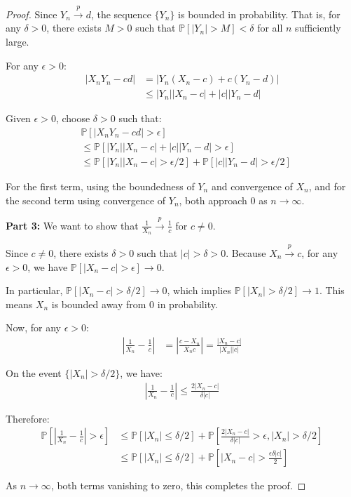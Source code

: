\begin{proof}
    Since $Y_n \xrightarrow{p} d$, the sequence $\{Y_n\}$ is bounded in probability. That is, for any $\delta > 0$, there exists $M > 0$ such that $\mathbb{P}[|Y_n| > M] < \delta$ for all $n$ sufficiently large.
    
    For any $\epsilon > 0$:
    \begin{align*}
        |X_n Y_n - cd| &= |Y_n(X_n - c) + c(Y_n - d)| \\
        &\leq |Y_n||X_n - c| + |c||Y_n - d|
    \end{align*}
    
    Given $\epsilon > 0$, choose $\delta > 0$ such that:
    \begin{align*}
        &\mathbb{P}[|X_n Y_n - cd| > \epsilon] \\
        &\leq \mathbb{P}[|Y_n||X_n - c| + |c||Y_n - d| > \epsilon] \\
        &\leq \mathbb{P}[|Y_n||X_n - c| > \epsilon/2] + \mathbb{P}[|c||Y_n - d| > \epsilon/2]
    \end{align*}
    
    For the first term, using the boundedness of $Y_n$ and convergence of $X_n$, and for the second term using convergence of $Y_n$, both approach 0 as $n \to \infty$.
    
    \textbf{Part 3:} We want to show that $\frac{1}{X_n} \xrightarrow{p} \frac{1}{c}$ for $c \neq 0$.
    
    Since $c \neq 0$, there exists $\delta > 0$ such that $|c| > \delta > 0$. Because $X_n \xrightarrow{p} c$, for any $\epsilon > 0$, we have $\mathbb{P}[|X_n - c| > \epsilon] \to 0$.
    
    In particular, $\mathbb{P}[|X_n - c| > \delta/2] \to 0$, which implies $\mathbb{P}[|X_n| > \delta/2] \to 1$. This means $X_n$ is bounded away from 0 in probability.
    
    Now, for any $\epsilon > 0$:
    \begin{align*}
        \left|\frac{1}{X_n} - \frac{1}{c}\right| &= \left|\frac{c - X_n}{X_n c}\right| = \frac{|X_n - c|}{|X_n||c|}
    \end{align*}
    
    On the event $\{|X_n| > \delta/2\}$, we have:
    \begin{align*}
        \left|\frac{1}{X_n} - \frac{1}{c}\right| \leq \frac{2|X_n - c|}{\delta|c|}
    \end{align*}
    
    Therefore:
    \begin{align*}
        \mathbb{P}\left[\left|\frac{1}{X_n} - \frac{1}{c}\right| > \epsilon\right] &\leq \mathbb{P}[|X_n| \leq \delta/2] + \mathbb{P}\left[\frac{2|X_n - c|}{\delta|c|} > \epsilon, |X_n| > \delta/2\right] \\
        &\leq \mathbb{P}[|X_n| \leq \delta/2] + \mathbb{P}\left[|X_n - c| > \frac{\epsilon\delta|c|}{2}\right]
    \end{align*}
    
    As $n \to \infty$, both terms vanishing to zero, this completes the proof.
\end{proof}

